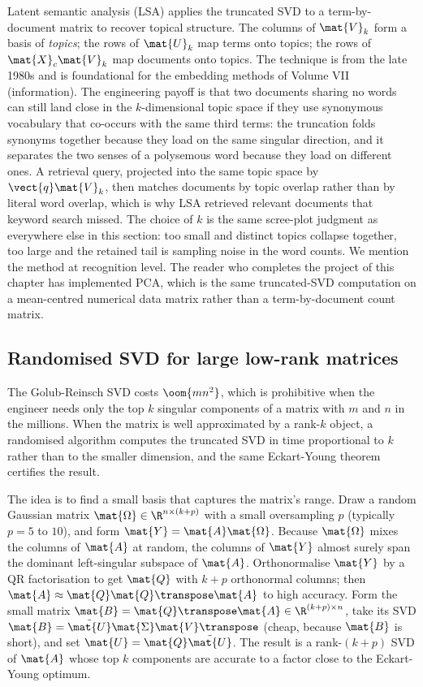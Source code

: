 Latent semantic analysis (LSA) applies the truncated SVD to a
term-by-document matrix to recover topical structure. The columns
of $\mat{V}_{k}$ form a basis of \emph{topics}; the rows of
$\mat{U}_{k}$ map terms onto topics; the rows of $\mat{X}_{c}
\mat{V}_{k}$ map documents onto topics. The technique is from the
late 1980s and is foundational for the embedding methods of Volume
VII (information). The engineering payoff is that two documents sharing
no words can still land close in the $k$-dimensional topic space if
they use synonymous vocabulary that co-occurs with the same third
terms: the truncation folds synonyms together because they load on the
same singular direction, and it separates the two senses of a
polysemous word because they load on different ones. A retrieval query,
projected into the same topic space by $\vect{q}\mat{V}_k$, then matches
documents by topic overlap rather than by literal word overlap, which
is why LSA retrieved relevant documents that keyword search missed.
The choice of $k$ is the same scree-plot judgment as everywhere else in
this section: too small and distinct topics collapse together, too
large and the retained tail is sampling noise in the word counts. We
mention the method at recognition level. The reader who completes the
project of this chapter has implemented PCA, which is the same
truncated-SVD computation on a mean-centred numerical data matrix
rather than a term-by-document count matrix.

\subsection{Randomised SVD for large low-rank matrices}

The Golub-Reinsch SVD costs $\oom{mn^{2}}$, which is prohibitive when
the engineer needs only the top $k$ singular components of a matrix
with $m$ and $n$ in the millions. When the matrix is well
approximated by a rank-$k$ object, a randomised algorithm computes the
truncated SVD in time proportional to $k$ rather than to the smaller
dimension, and the same Eckart-Young theorem certifies the result.

The idea is to find a small basis that captures the matrix's range.
Draw a random Gaussian matrix $\mat{\Omega} \in \R^{n \times (k + p)}$
with a small oversampling $p$ (typically $p = 5$ to $10$), and form
$\mat{Y} = \mat{A}\mat{\Omega}$. Because $\mat{\Omega}$ mixes the
columns of $\mat{A}$ at random, the columns of $\mat{Y}$ almost surely
span the dominant left-singular subspace of $\mat{A}$. Orthonormalise
$\mat{Y}$ by a QR factorisation to get $\mat{Q}$ with $k + p$
orthonormal columns; then $\mat{A} \approx \mat{Q}\mat{Q}\transpose
\mat{A}$ to high accuracy. Form the small matrix $\mat{B} =
\mat{Q}\transpose \mat{A} \in \R^{(k+p) \times n}$, take its SVD
$\mat{B} = \tilde{\mat{U}}\mat{\Sigma}\mat{V}\transpose$ (cheap,
because $\mat{B}$ is short), and set $\mat{U} = \mat{Q}\tilde{\mat{U}}$.
The result is a rank-$(k + p)$ SVD of $\mat{A}$ whose top $k$
components are accurate to a factor close to the Eckart-Young optimum.

